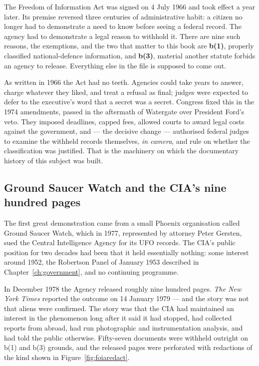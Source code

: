 The Freedom of Information Act was signed on 4 July 1966 and took effect a year later. Its premise
reversed three centuries of administrative habit: a citizen no longer had to demonstrate a need to
know before seeing a federal record. The agency had to demonstrate a legal reason to withhold it.
There are nine such reasons, the exemptions, and the two that matter to this book are \textbf{b(1)},
properly classified national-defence information, and \textbf{b(3)}, material another statute forbids
an agency to release. Everything else in the file is supposed to come out.

As written in 1966 the Act had no teeth. Agencies could take years to answer, charge whatever they
liked, and treat a refusal as final; judges were expected to defer to the executive's word that a
secret was a secret. Congress fixed this in the 1974 amendments, passed in the aftermath of Watergate
over President Ford's veto. They imposed deadlines, capped fees, allowed courts to award legal costs
against the government, and --- the decisive change --- authorised federal judges to examine the
withheld records themselves, \emph{in camera}, and rule on whether the classification was justified.
 That is the machinery on which the documentary
history of this subject was built.

\subsection{Ground Saucer Watch and the CIA's nine hundred pages}\label{sec:gsw}

The first great demonstration came from a small Phoenix organisation called Ground Saucer Watch,
which in 1977, represented by attorney Peter Gersten, sued the Central Intelligence Agency for its
UFO records. The CIA's public position for two decades had been that it held essentially nothing:
some interest around 1952, the Robertson Panel of January 1953 described in
Chapter~\ref{ch:government}, and no continuing programme.

In December 1978 the Agency released roughly nine hundred pages. \emph{The New York Times} reported
the outcome on 14 January 1979 --- and the story was not that aliens were confirmed. The story was
that the CIA had maintained an interest in the phenomenon long after it said it had stopped, had
collected reports from abroad, had run photographic and instrumentation analysis, and had told the
public otherwise. Fifty-seven documents were withheld outright on b(1) and b(3) grounds, and the
released pages were perforated with redactions of the kind shown in Figure~\ref{fig:foiaredact}.

